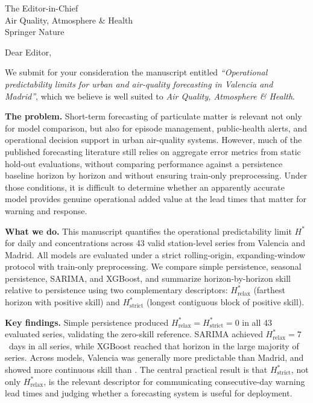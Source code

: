 \documentclass[12pt, a4paper]{letter}
\begin{document}
\begin{letter}{The Editor-in-Chief\\
               Air Quality, Atmosphere \& Health\\
               Springer Nature}

\opening{Dear Editor,}

We submit for your consideration the manuscript entitled
\textit{``Operational predictability limits for urban  and
 air-quality forecasting in Valencia and Madrid''},
which we believe is well suited to
\textit{Air Quality, Atmosphere \& Health}.

\textbf{The problem.}
Short-term forecasting of particulate matter is relevant not only for
model comparison, but also for episode management, public-health
alerts, and operational decision support in urban air-quality systems.
However, much of the published forecasting literature still relies on
aggregate error metrics from static hold-out evaluations, without
comparing performance against a persistence baseline horizon by horizon
and without ensuring train-only preprocessing. Under those conditions,
it is difficult to determine whether an apparently accurate model
provides genuine operational added value at the lead times that matter
for warning and response.

\textbf{What we do.}
This manuscript quantifies the operational predictability limit $H^*$
for daily  and  concentrations across 43 valid
station-level series from Valencia and Madrid. All models are evaluated
under a strict rolling-origin, expanding-window protocol with
train-only preprocessing. We compare simple persistence, seasonal
persistence, SARIMA, and XGBoost, and summarize horizon-by-horizon
skill relative to persistence using two complementary descriptors:
$H^*_{\mathrm{relax}}$ (farthest horizon with positive skill) and
$H^*_{\mathrm{strict}}$ (longest contiguous block of positive skill).

\textbf{Key findings.}
Simple persistence produced $H^*_{\mathrm{relax}} =
H^*_{\mathrm{strict}} = 0$ in all 43 evaluated series, validating the
zero-skill reference. SARIMA achieved $H^*_{\mathrm{relax}} = 7$~days
in all series, while XGBoost reached that horizon in the large
majority of series. Across models, Valencia was generally more
predictable than Madrid, and  showed more continuous skill
than . The central practical result is that
$H^*_{\mathrm{strict}}$, not only $H^*_{\mathrm{relax}}$, is the
relevant descriptor for communicating consecutive-day warning lead
times and judging whether a forecasting system is useful for deployment.


\end{letter}
\end{document}
